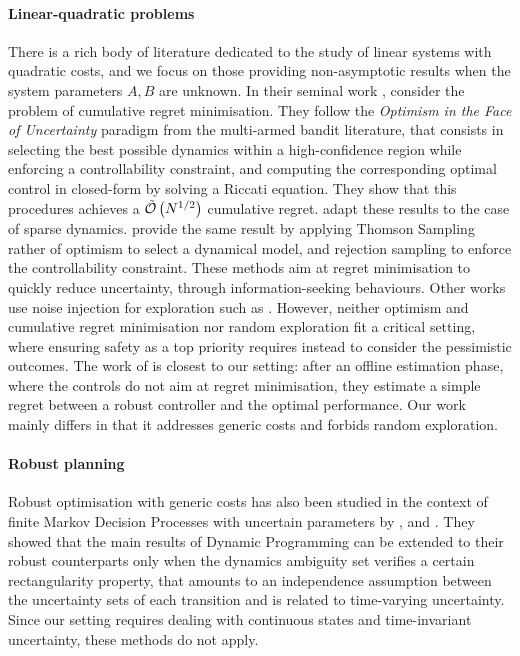 \paragraph{Linear-quadratic problems} There is a rich body of literature dedicated to the study of linear systems with quadratic costs, and we focus on those providing non-asymptotic results when the system parameters $A, B$ are unknown. In their seminal work \citet{abbasi-yadkori11a}, consider the problem of cumulative regret minimisation. They follow the \emph{Optimism in the Face of Uncertainty} paradigm from the multi-armed bandit literature, that consists in selecting the best possible dynamics within a high-confidence region while enforcing a controllability constraint, and computing the corresponding optimal control in closed-form by solving a Riccati equation. They show that this procedures achieves a $\tilde{\mathcal{O}}\left(N^{1/2}\right)$ cumulative regret. \citep{Ibrahimi2013,Faradonbeh2017} adapt these results to the case of sparse dynamics. \citet{Ouyang2017,abeille18a} provide the same result by applying Thomson Sampling rather of optimism to select a dynamical model, and rejection sampling to enforce the controllability constraint. These methods aim at regret minimisation to quickly reduce uncertainty, through information-seeking behaviours. Other works use noise injection for exploration such as \citep{Dean2017,Dean2018}. However, neither optimism and cumulative regret minimisation nor random exploration fit a critical setting, where ensuring safety as a top priority requires instead to consider the pessimistic outcomes.
The work of \citet{Dean2017} is closest to our setting: after an offline estimation phase, where the controls do not aim at regret minimisation, they estimate a simple regret between a robust controller and the optimal performance. Our work mainly differs in that it addresses generic costs and forbids random exploration.

\paragraph{Robust planning}
Robust optimisation with generic costs has also been studied in the context of finite Markov Decision Processes with uncertain parameters by \citet{Iyengar2005}, \citet{Nilim2005} and \citet{Wiesemann2013}. They showed that the main results of Dynamic Programming can be extended to their robust counterparts only when the dynamics ambiguity set verifies a certain rectangularity property, that amounts to an independence assumption between the uncertainty sets of each transition and is related to time-varying uncertainty. Since our setting requires dealing with continuous states and time-invariant uncertainty, these methods do not apply.


